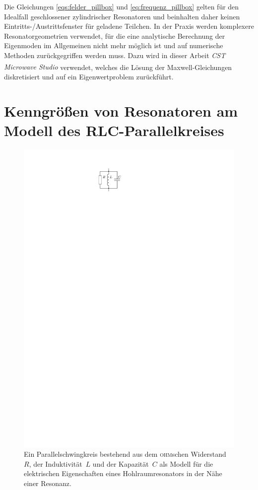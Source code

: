 Die Gleichungen \eqref{eqs:felder_pillbox} und \eqref{eq:frequenz_pillbox} gelten für den Idealfall geschlossener zylindrischer Resonatoren und beinhalten daher keinen Eintritts-/Austrittsfenster für geladene Teilchen.
In der Praxis werden komplexere Resonatorgeometrien verwendet, für die eine analytische Berechnung der Eigenmoden im Allgemeinen nicht mehr möglich ist und auf numerische Methoden zurückgegriffen werden muss.
Dazu wird in dieser Arbeit \emph{CST Microwave Studio\textsuperscript{\textregistered}} verwendet, welches die Lösung der Maxwell-Gleichungen diskretisiert und auf ein Eigenwertproblem zurückführt.


\section{Kenngrößen von Resonatoren am Modell des RLC-Parallelkreises}
\begin{figure}[htb]
  \centering
  \includegraphics[scale=1.4]{./figs/RLC_circuit.pdf}
  \caption[Parallelschwingkreis als Modell für die elektrischen Eigenschaften eines Hohlraumresonators in der Nähe einer Resonanz]{Ein Parallelschwingkreis bestehend aus dem \textsc{ohm}schen Widerstand~$R$, der Induktivität~$L$ und der Kapazität~$C$ als Modell für die elektrischen Eigenschaften eines Hohlraumresonators in der Nähe einer Resonanz.}
  \label{fig:rlc_circuit}
\end{figure}
